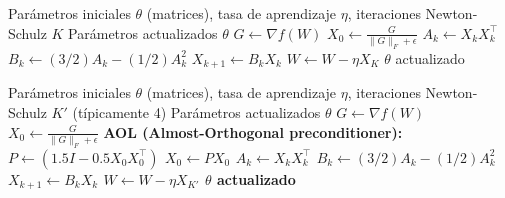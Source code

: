 \begin{algorithm}[H]
\caption{Muon (Ortogonalización de Newton-Schulz)}
\label{alg:muon}
\begin{algorithmic}[1]
\Require Parámetros iniciales $\theta$ (matrices), tasa de aprendizaje $\eta$, iteraciones Newton-Schulz $K$
\Ensure Parámetros actualizados $\theta$
    \State $G \gets \nabla f(W)$ 
    \State $X_0 \gets \frac{G}{\|G\|_F + \epsilon}$ 
        \State $A_k \gets X_k X_k^\top$ 
        \State $B_k \gets (3/2) A_k - (1/2) A_k^2$ 
        \State $X_{k+1} \gets B_k X_k$ 
    \EndFor
    \State $W \gets W - \eta X_K$ 
\EndFor
\Return $\theta$ actualizado
\end{algorithmic}
\end{algorithm}

\begin{algorithm}[H]
\caption{Turbo-Muon (Ortogonalización Precondicionada con AOL)}
\label{alg:turbo-muon}
\begin{algorithmic}[1]
\Require Parámetros iniciales $\theta$ (matrices), tasa de aprendizaje $\eta$, iteraciones Newton-Schulz $K'$ (típicamente 4)
\Ensure Parámetros actualizados $\theta$
    \State $G \gets \nabla f(W)$ 
    \State $X_0 \gets \frac{G}{\|G\|_F + \epsilon}$ 
    \State \bf{AOL (Almost-Orthogonal preconditioner):} 
    \State $P \gets (1.5 I - 0.5 X_0 X_0^\top)$ 
    \State $X_0 \gets P X_0$ 
        \State $A_k \gets X_k X_k^\top$
        \State $B_k \gets (3/2) A_k - (1/2) A_k^2$
        \State $X_{k+1} \gets B_k X_k$ 
    \EndFor
    \State $W \gets W - \eta X_{K'}$ 
\EndFor
\Return $\theta$ actualizado
\end{algorithmic}
\end{algorithm}

